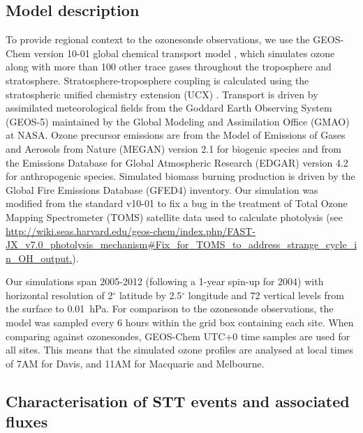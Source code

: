 \documentclass{article}
\begin{document}
  \subsection{Model description}
    \label{Section:GEOSChemDescription}
    To provide regional context to the ozonesonde observations, we use the GEOS-Chem version 10-01 global chemical transport model \citep{Bey2001}, which simulates ozone along with more than 100 other trace gases throughout the troposphere and stratosphere. 
    Stratosphere-troposphere coupling is calculated using the stratospheric unified chemistry extension (UCX) \citep{Eastham2014}.
    Transport is driven by assimilated meteorological fields from the Goddard Earth Observing System (GEOS-5) maintained by the Global Modeling and Assimilation Office (GMAO) at NASA.
    Ozone precursor emissions are from the Model of Emissions of Gases and Aerosols from Nature (MEGAN) version 2.1 \citep{Guenther2012} for biogenic species and from the Emissions Database for Global Atmospheric Research (EDGAR) version 4.2 for anthropogenic species.
    Simulated biomass burning production is driven by the Global Fire Emissions Database (GFED4) inventory. 
    Our simulation was modified from the standard v10-01 to fix a bug in the treatment of Total Ozone Mapping Spectrometer (TOMS) satellite data used to calculate photolysis (see \url{http://wiki.seas.harvard.edu/geos-chem/index.php/FAST-JX_v7.0_photolysis_mechanism#Fix_for_TOMS_to_address_strange_cycle_in_OH_output.}).  

    Our simulations span 2005-2012 (following a 1-year spin-up for 2004) with horizontal resolution of 2$^{\circ}$ latitude by 2.5$^{\circ}$ longitude and 72 vertical levels from the surface to 0.01~hPa.
    For comparison to the ozonesonde observations, the model was sampled every 6 hours within the grid box containing each site.
    When comparing against ozonesondes, GEOS-Chem UTC+0 time samples are used for all sites.
    This means that the simulated ozone profiles are analysed at local times of 7AM for Davis, and 11AM for Macquarie and Melbourne.
    
  \subsection{Characterisation of STT events and associated fluxes}
    \label{Section:CharacterisationOfSTTs}
    
\end{document}
